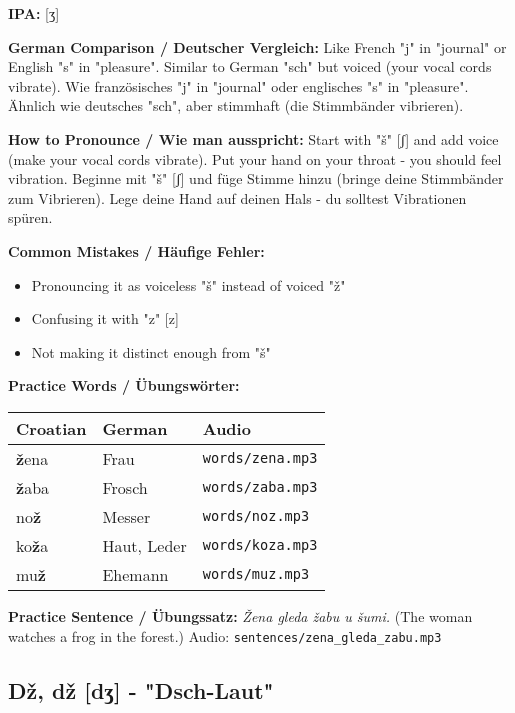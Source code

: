 \begin{tcolorbox}[colback=lightblue!30, colframe=croatianblue, title=\textbf{Ž, ž}]

\textbf{IPA:} [ʒ]

\textbf{German Comparison / Deutscher Vergleich:}
Like French "j" in "journal" or English "s" in "pleasure". Similar to German "sch" but voiced (your vocal cords vibrate).
Wie französisches "j" in "journal" oder englisches "s" in "pleasure". Ähnlich wie deutsches "sch", aber stimmhaft (die Stimmbänder vibrieren).

\textbf{How to Pronounce / Wie man ausspricht:}
Start with "š" [ʃ] and add voice (make your vocal cords vibrate). Put your hand on your throat - you should feel vibration.
Beginne mit "š" [ʃ] und füge Stimme hinzu (bringe deine Stimmbänder zum Vibrieren). Lege deine Hand auf deinen Hals - du solltest Vibrationen spüren.

\textbf{Common Mistakes / Häufige Fehler:}
\begin{itemize}
    \item Pronouncing it as voiceless "š" instead of voiced "ž"
    \item Confusing it with "z" [z]
    \item Not making it distinct enough from "š"
\end{itemize}

\textbf{Practice Words / Übungswörter:}
\begin{tabular}{lll}
\textbf{Croatian} & \textbf{German} & \textbf{Audio} \\
\midrule
\textbf{ž}ena & Frau & \texttt{words/zena.mp3} \\
\textbf{ž}aba & Frosch & \texttt{words/zaba.mp3} \\
no\textbf{ž} & Messer & \texttt{words/noz.mp3} \\
ko\textbf{ž}a & Haut, Leder & \texttt{words/koza.mp3} \\
mu\textbf{ž} & Ehemann & \texttt{words/muz.mp3} \\
\end{tabular}

\textbf{Practice Sentence / Übungssatz:}
\textit{Žena gleda žabu u šumi.}
(The woman watches a frog in the forest.)
Audio: \texttt{sentences/zena\_gleda\_zabu.mp3}

\end{tcolorbox}

\subsection{Dž, dž [dʒ] - "Dsch-Laut"}

